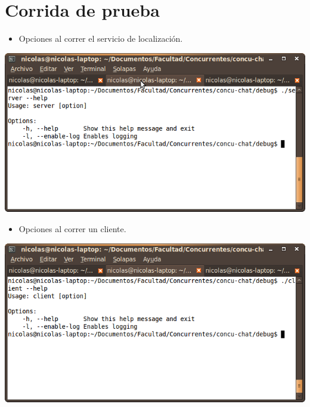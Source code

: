\section{Corrida de prueba}

\begin{itemize}
  \item Opciones al correr el servicio de localización.
\end{itemize}
\begin{center}
  \small\includegraphics[scale=0.65]{./Images/AyudaServer}
\end{center}

\begin{itemize}
  \item Opciones al correr un cliente.
\end{itemize}
\begin{center}
  \small\includegraphics[scale=0.65]{./Images/AyudaCliente}
\end{center}


